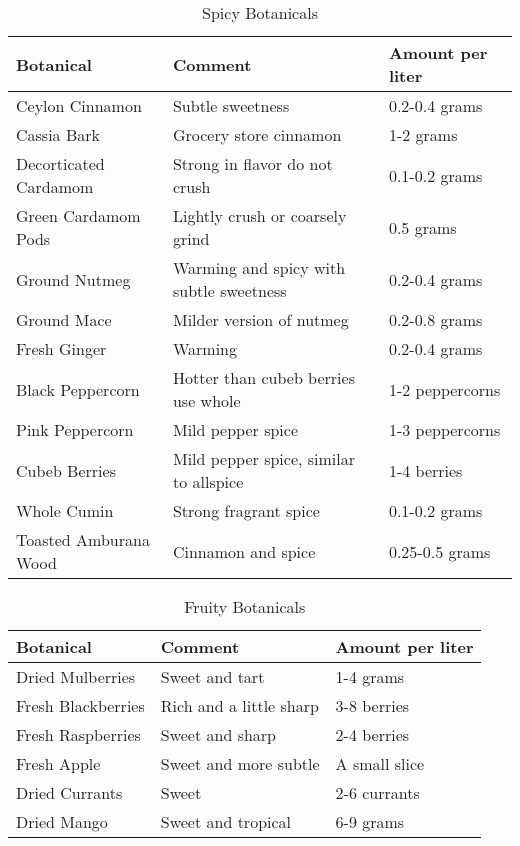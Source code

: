 \documentclass[letterpaper]{recipePMG}
\begin{document}
\begin{table}[H]
    \centering
    \caption{Spicy Botanicals}
    \begin{tabular}{@{}p{1.25in}p{3in}p{1.25in}@{}}
        \toprule
      Botanical &  Comment & Amount per liter \\
        \midrule
		Ceylon Cinnamon & Subtle sweetness & 0.2-0.4 grams \\
		Cassia Bark & Grocery store cinnamon & 1-2 grams \\
		Decorticated Cardamom & Strong in flavor do not crush & 0.1-0.2 grams \\
		Green Cardamom Pods & Lightly crush or coarsely grind & 0.5 grams \\
		Ground Nutmeg & Warming and spicy with subtle sweetness & 0.2-0.4 grams \\
		Ground Mace & Milder version of nutmeg & 0.2-0.8 grams \\
		Fresh Ginger & Warming & 0.2-0.4 grams \\
		Black Peppercorn & Hotter than cubeb berries use whole & 1-2 peppercorns \\
		Pink Peppercorn & Mild pepper spice & 1-3 peppercorns \\
		Cubeb Berries & Mild pepper spice, similar to allspice & 1-4 berries \\
		Whole Cumin & Strong fragrant spice & 0.1-0.2 grams \\
        Toasted Amburana Wood & Cinnamon and spice & 0.25-0.5 grams \\
\end{tabular}
    \label{tab:spicy}
\end{table}

\begin{table}[H]
    \centering
    \caption{Fruity Botanicals}
    \begin{tabular}{@{}p{1.25in}p{3in}p{1.25in}@{}}
        \toprule
      Botanical &  Comment & Amount per liter \\
        \midrule
		Dried Mulberries & Sweet and tart & 1-4 grams \\
		Fresh Blackberries & Rich and a little sharp &  3-8 berries \\
		Fresh Raspberries & Sweet and sharp & 2-4 berries \\
		Fresh Apple & Sweet and more subtle & A small slice \\
		Dried Currants & Sweet & 2-6 currants \\
		Dried Mango & Sweet and tropical & 6-9 grams \\
\end{tabular}
    \label{tab:fruity}
\end{table}
\end{document}
